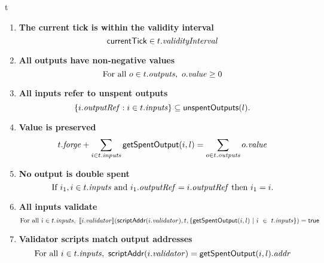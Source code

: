 \begin{ruledfigure}{t}
\begin{enumerate}

\item
  \label{rule:slot-in-range}
  \textbf{The current tick is within the validity interval}
  \begin{displaymath}
    \mathsf{currentTick} \in t.\textit{validityInterval}
  \end{displaymath}

\item
  \label{rule:all-outputs-are-non-negative}
  \textbf{All outputs have non-negative values}
  \begin{displaymath}
    \textrm{For all } o \in t.\mathit{outputs},\ o.\mathit{value} \geq 0
  \end{displaymath}

\item
  \label{rule:all-inputs-refer-to-unspent-outputs}
  \textbf{All inputs refer to unspent outputs}
  \begin{displaymath}
    \{i.\mathit{outputRef}: i \in t.\mathit{inputs} \} \subseteq \mathsf{unspentOutputs}(l).
  \end{displaymath}

\item
  \label{rule:value-is-preserved}
  \textbf{Value is preserved}
  \begin{displaymath}
    t.\mathit{forge} + \sum_{i \in t.\mathit{inputs}} \mathsf{getSpentOutput}(i, l) = \sum_{o \in t.\mathit{outputs}} o.\mathit{value}
  \end{displaymath}

\item
  \label{rule:no-double-spending}
  \textbf{No output is double spent}
  \begin{displaymath}
    \textrm{If } i_1, i \in t.\mathit{inputs} \textrm{ and }  i_1.\mathit{outputRef} = i.\mathit{outputRef}
    \textrm{ then } i_1 = i.
  \end{displaymath}

\item
  \label{rule:all-inputs-validate}
  \textbf{All inputs validate}
  \begin{displaymath}
    \textrm{For all } i \in t.\mathit{inputs},\
    \llbracket i.\mathit{validator}\rrbracket(\mathsf{scriptAddr}(i.\mathit{validator}), t,
    \{\mathsf{getSpentOutput}(i, l) ~\vert~ i~\in~ t.\mathit{inputs}\}) = \textsf{true}
  \end{displaymath}

\item
  \label{rule:validator-scripts-hash}
  \textbf{Validator scripts match output addresses}
  \begin{displaymath}
    \textrm{For all } i \in t.\mathit{inputs},\ \mathsf{scriptAddr}(i.\mathit{validator}) = \mathsf{getSpentOutput}(i, l).\mathit{addr}
  \end{displaymath}


\end{enumerate}
\end{ruledfigure}
